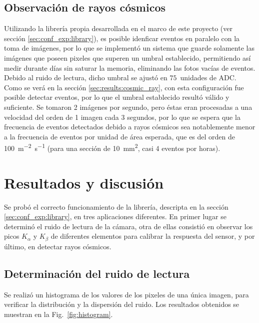 \documentclass[twoside,twocolumn]{article}
\begin{document}
    \subsection{Observación de rayos cósmicos}\label{sec:conf_exp:cosmic_ray}
      Utilizando la librería propia desarrollada en el marco de este proyecto (ver sección \ref{sec:conf_exp:library}),
      es posible idenficar eventos en paralelo con la toma de imágenes,
      por lo que se implementó un sistema que guarde solamente las imágenes que poseen pixeles que superen un umbral establecido,
      permitiendo así medir durante días sin saturar la memoria, eliminando las fotos vacías de eventos.
      Debido al ruido de lectura, dicho umbral se ajustó en $75$~unidades de ADC.
      Como se verá en la sección \ref{sec:results:cosmic_ray}, con esta configuración fue posible detectar eventos,
      por lo que el umbral establecido resultó válido y suficiente.
      Se tomaron 2 imágenes por segundo, pero éstas eran procesadas a una velocidad
      del orden de 1 imagen cada 3 segundos, por lo que se espera que la frecuencia de eventos
      detectados debido a rayos cósmicos sea notablemente menor a la frecuencia de eventos por unidad de área esperada,
      que es del orden de \SI{100}{\meter^{-2}\second^{-1}}
      (para una sección de \SI{10}{\milli\meter^2}, casi 4 eventos por horas).

  \section{Resultados y discusión}\label{sec:results}
    Se probó el correcto funcionamiento de la librería, descripta en la sección \ref{sec:conf_exp:library},
    en tres aplicaciones diferentes.
    En primer lugar se determinó el ruido de lectura de la cámara,
    otra de ellas consistió en observar los picos $K_{\alpha}$ y $K_{\beta}$ de diferentes elementos
    para calibrar la respuesta del sensor,
    y por último, en detectar rayos cósmicos.

    \subsection{Determinación del ruido de lectura}\label{sec:results:background}
      Se realizó un histograma de los valores de los pixeles de una única imagen,
      para verificar la distribución y la dispersión del ruido.
      Los resultados obtenidos se muestran en la Fig.~\ref{fig:histogram}.
\end{document}
